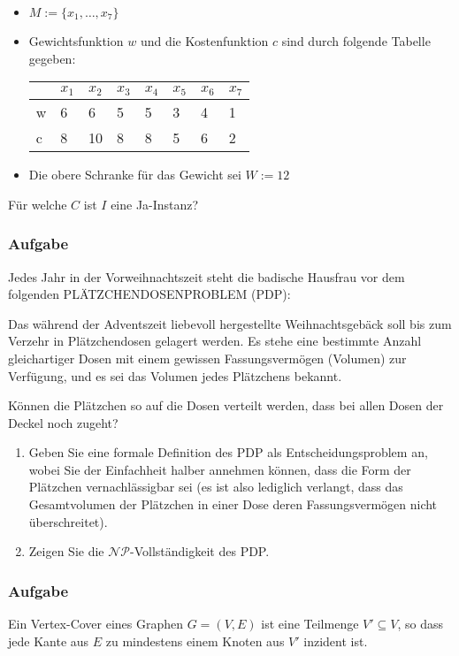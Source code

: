 \documentclass{beamer}
\begin{document}
{\begin{frame}
\begin{itemize}
\item $M := \{x_1, \ldots, x_7\}$
\item Gewichtsfunktion $w$ und die Kostenfunktion $c$ sind durch folgende Tabelle gegeben:

\begin{center}
\begin{tabular}{l|l|l|l|l|l|l|l}
	  &$x_1$ &$x_2$ &$x_3$ 	&$x_4$ 	&$x_5$ 	&$x_6$ 	&$x_7$\\ 	
  \hline
	w &6	 &6	&5	&5	&3	&4	&1\\
  \hline
	c &8	 &10	&8	&8	&5	&6	&2\\
\end{tabular}
\end{center}
\item Die obere Schranke für das Gewicht sei $W:=12$
\end{itemize}

Für welche $C$ ist $I$ eine Ja-Instanz?  
\end{frame}

\begin{frame}
\frametitle{Aufgabe}
Jedes Jahr in der Vorweihnachtszeit steht die badische Hausfrau vor dem folgenden PLÄTZCHENDOSENPROBLEM (PDP):

\hspace{1cm}\parbox{0.8\textwidth}{Das während der Adventszeit liebevoll hergestellte Weihnachtsgebäck soll bis zum Verzehr in Plätzchendosen gelagert werden.
Es stehe eine bestimmte Anzahl gleichartiger Dosen mit einem gewissen Fassungsvermögen (Volumen) zur Verfügung, und es sei das Volumen jedes Plätzchens bekannt.

Können die Plätzchen so auf die Dosen verteilt werden, dass bei allen Dosen der Deckel noch zugeht?}
\begin{enumerate}
 \item Geben Sie eine formale Definition des PDP als Entscheidungsproblem an, wobei Sie der Einfachheit halber annehmen können, dass die Form der Plätzchen vernachlässigbar sei (es ist also lediglich verlangt, dass das Gesamtvolumen der Plätzchen in einer Dose deren Fassungsvermögen nicht überschreitet).
 \item Zeigen Sie die $\mathcal{NP}$-Vollständigkeit des PDP.
\end{enumerate}
\end{frame}
\begin{frame}
\frametitle{Aufgabe}
Ein Vertex-Cover eines Graphen $G=(V,E)$ ist eine Teilmenge $V'\subseteq V$, so
dass jede Kante aus $E$ zu mindestens einem Knoten aus $V'$ inzident ist.


\end{frame}}
\end{document}
